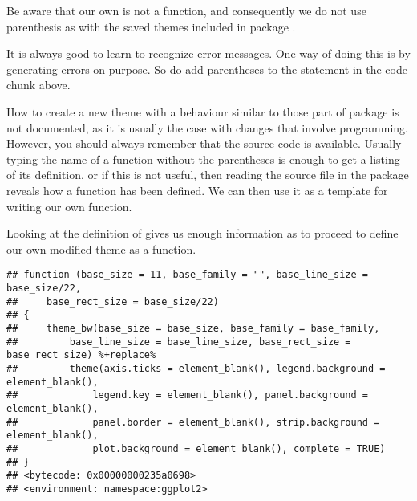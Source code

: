 \documentclass[krantz2]{krantz}\usepackage{knitr}%
\begin{document}
Be aware that our own  is not a function, and consequently we do not use parenthesis as with the saved themes included in package \ggplot.

\begin{playground}
It is always good to learn to recognize error messages. One way of doing this is by generating errors on purpose. So do add parentheses to the statement in the code chunk above.
\end{playground}

\begin{explainbox}
How to create a new theme with a behaviour similar to those part of package \ggplot is not documented, as it is usually the case with changes that involve programming. However, you should always remember that the source code is available. Usually typing the name of a function without the parentheses is enough to get a listing of its definition, or if this is not useful, then reading the source file in the package reveals how a function has been defined. We can then use it as a template for writing our own function.
\end{explainbox}

Looking at the definition of  gives us enough information as to proceed to define our own modified theme as a function.

\begin{knitrout}\footnotesize
{}\color{fgcolor}\begin{kframe}
\begin{alltt}
\end{alltt}
\begin{verbatim}
## function (base_size = 11, base_family = "", base_line_size = base_size/22, 
##     base_rect_size = base_size/22) 
## {
##     theme_bw(base_size = base_size, base_family = base_family, 
##         base_line_size = base_line_size, base_rect_size = base_rect_size) %+replace% 
##         theme(axis.ticks = element_blank(), legend.background = element_blank(), 
##             legend.key = element_blank(), panel.background = element_blank(), 
##             panel.border = element_blank(), strip.background = element_blank(), 
##             plot.background = element_blank(), complete = TRUE)
## }
## <bytecode: 0x00000000235a0698>
## <environment: namespace:ggplot2>
\end{verbatim}
\end{kframe}
\end{knitrout}
\end{document}
